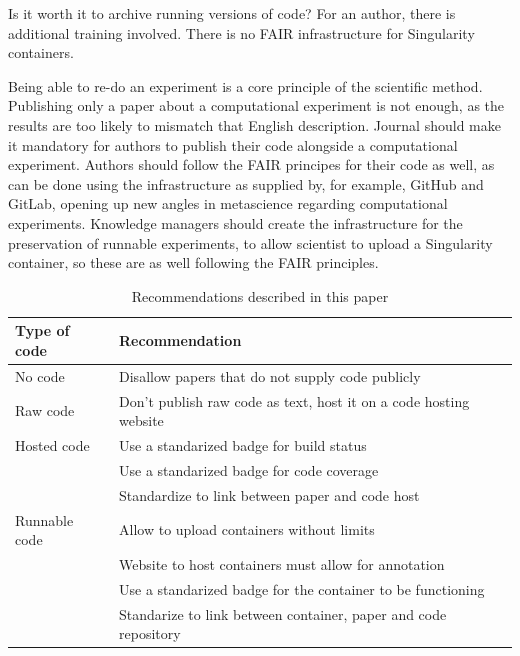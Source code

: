 
Is it worth it to archive running versions of code?
For an author, 
there is additional training involved.
There is no FAIR infrastructure for Singularity containers.



Being able to re-do an experiment is a core principle of the scientific method.
Publishing only a paper about a computational experiment is not enough,
as the results are too likely to mismatch that English description.
Journal should make it mandatory for authors
to publish their code alongside a computational experiment.
Authors should follow the FAIR principes for their code as well,
as can be done using the infrastructure as supplied by, 
for example, GitHub and GitLab, opening up new angles in
metascience regarding computational experiments.
Knowledge managers should create the infrastructure for the preservation
of runnable experiments, to allow scientist to upload a Singularity
container, so these are as well following the FAIR principles.

\begin{table}[h]
  \begin{tabular}{|p{2cm}|l|}
    \hline
    \textbf{Type of code} & \textbf{Recommendation} \\
    \hline
    No code       & Disallow papers that do not supply code publicly \\
    \hline
    Raw code      & Don't publish raw code as text, host it on a code hosting website \\
    \hline
    Hosted code   & Use a standarized badge for build status \\
                  & Use a standarized badge for code coverage \\
                  & Standardize to link between paper and code host \\
    \hline
    Runnable code & Allow to upload containers without limits \\
                  & Website to host containers must allow for annotation \\
                  & Use a standarized badge for the container to be functioning  \\
                  & Standarize to link between container, paper and code repository \\
    \hline
  \end{tabular}
  \caption{Recommendations described in this paper}
  \label{tab:recommendations}
\end{table}

